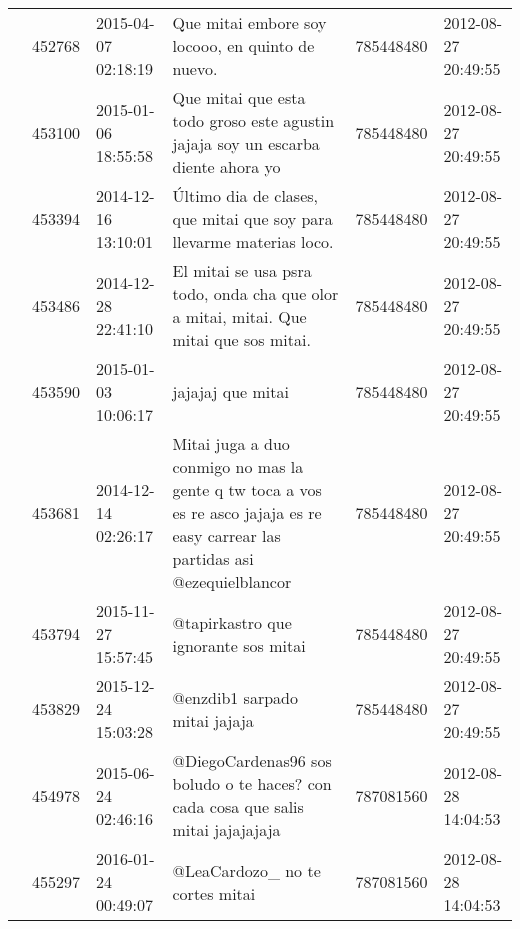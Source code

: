 \begin{tabular}{llllrl}
           & 452768  & 2015-04-07 02:18:19 &                                                                                             Que mitai embore soy locooo, en quinto de nuevo. &   785448480 & 2012-08-27 20:49:55 \\
           & 453100  & 2015-01-06 18:55:58 &                                                             Que mitai que esta todo groso este agustin jajaja soy un escarba diente ahora yo &   785448480 & 2012-08-27 20:49:55 \\
           & 453394  & 2014-12-16 13:10:01 &                                                                         Último dia de clases, que mitai que soy para llevarme materias loco. &   785448480 & 2012-08-27 20:49:55 \\
           & 453486  & 2014-12-28 22:41:10 &                                                       El mitai se usa psra todo,  onda cha que olor a mitai, mitai. Que mitai que sos mitai. &   785448480 & 2012-08-27 20:49:55 \\
           & 453590  & 2015-01-03 10:06:17 &                                                                                                                            jajajaj que mitai &   785448480 & 2012-08-27 20:49:55 \\
           & 453681  & 2014-12-14 02:26:17 &              Mitai juga a duo conmigo no mas la gente q tw toca a vos es re asco jajaja es re easy carrear las partidas asi @ezequielblancor &   785448480 & 2012-08-27 20:49:55 \\
           & 453794  & 2015-11-27 15:57:45 &                                                                                                         @tapirkastro que ignorante sos mitai &   785448480 & 2012-08-27 20:49:55 \\
           & 453829  & 2015-12-24 15:03:28 &                                                                                                                @enzdib1 sarpado mitai jajaja &   785448480 & 2012-08-27 20:49:55 \\
           & 454978  & 2015-06-24 02:46:16 &                                                             @DiegoCardenas96 sos boludo o te haces? con cada cosa que salis mitai jajajajaja &   787081560 & 2012-08-28 14:04:53 \\
           & 455297  & 2016-01-24 00:49:07 &                                                                                                              @LeaCardozo\_ no te cortes mitai &   787081560 & 2012-08-28 14:04:53 \\

\end{tabular}
